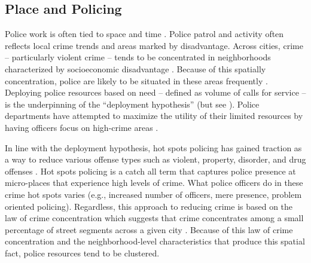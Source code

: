 \subsection{Place and Policing}

Police work is often tied to space and time \parencite{fyfe_police_1991}. Police patrol and activity often reflects local crime trends and areas marked by disadvantage. Across cities, crime – particularly violent crime – tends to be concentrated in neighborhoods characterized by socioeconomic disadvantage \parencite{peterson_divergent_2010}. Because of this spatially concentration, police are likely to be situated in these areas frequently \parencite{engel_race_2012, mitchell_criminal_2011}. Deploying police resources based on need – defined as volume of calls for service – is the underpinning of the “deployment hypothesis” (but see \cite{alexander_war_2010, beckett_penal_2010}). Police departments have attempted to maximize the utility of their limited resources by having officers focus on high-crime areas \parencite{skogan_fairness_2004, weisburd_reforming_2003}. 

In line with the deployment hypothesis, hot spots policing has gained traction as a way to reduce various offense types such as violent, property, disorder, and drug offenses \parencite{braga_hot_2019}. Hot spots policing is a catch all term that captures police presence at micro-places that experience high levels of crime. What police officers do in these crime hot spots varies (e.g., increased number of officers, mere presence, problem oriented policing). Regardless, this approach to reducing crime is based on the law of crime concentration which suggests that crime concentrates among a small percentage of street segments across a given city \parencite{braga_benefits_2017, weisburd_law_2015}. Because of this law of crime concentration and the neighborhood-level characteristics that produce this spatial fact, police resources tend to be clustered.

